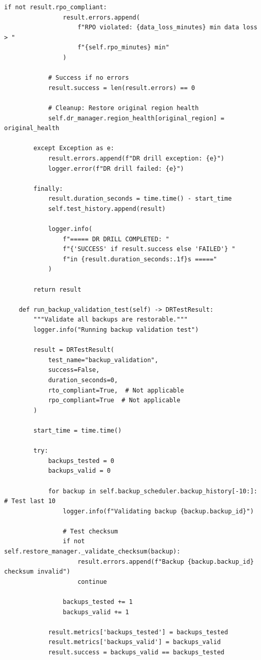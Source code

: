 \begin{lstlisting}[style=python, caption={Disaster Recovery Testing Framework}]
            if not result.rpo_compliant:
                result.errors.append(
                    f"RPO violated: {data_loss_minutes} min data loss > "
                    f"{self.rpo_minutes} min"
                )

            # Success if no errors
            result.success = len(result.errors) == 0

            # Cleanup: Restore original region health
            self.dr_manager.region_health[original_region] = original_health

        except Exception as e:
            result.errors.append(f"DR drill exception: {e}")
            logger.error(f"DR drill failed: {e}")

        finally:
            result.duration_seconds = time.time() - start_time
            self.test_history.append(result)

            logger.info(
                f"===== DR DRILL COMPLETED: "
                f"{'SUCCESS' if result.success else 'FAILED'} "
                f"in {result.duration_seconds:.1f}s ====="
            )

        return result

    def run_backup_validation_test(self) -> DRTestResult:
        """Validate all backups are restorable."""
        logger.info("Running backup validation test")

        result = DRTestResult(
            test_name="backup_validation",
            success=False,
            duration_seconds=0,
            rto_compliant=True,  # Not applicable
            rpo_compliant=True  # Not applicable
        )

        start_time = time.time()

        try:
            backups_tested = 0
            backups_valid = 0

            for backup in self.backup_scheduler.backup_history[-10:]:  # Test last 10
                logger.info(f"Validating backup {backup.backup_id}")

                # Test checksum
                if not self.restore_manager._validate_checksum(backup):
                    result.errors.append(f"Backup {backup.backup_id} checksum invalid")
                    continue

                backups_tested += 1
                backups_valid += 1

            result.metrics['backups_tested'] = backups_tested
            result.metrics['backups_valid'] = backups_valid
            result.success = backups_valid == backups_tested


\end{lstlisting}
